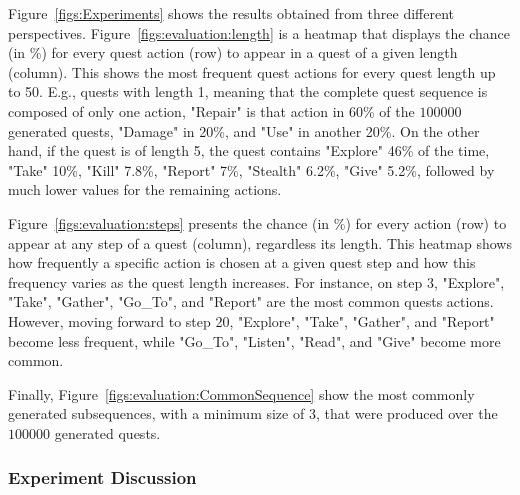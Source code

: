 
Figure~\ref{figs:Experiments} shows the results obtained from three different perspectives. Figure~\ref{figs:evaluation:length} is a heatmap that displays the chance (in \%) for every quest action (row) to appear in a quest of a given length (column). %
This shows the most frequent quest actions for every quest length up to 50. E.g., quests with length 1, meaning that the complete quest sequence is composed of only one action, "Repair" is that action in 60\% of the $100000$ generated quests, "Damage" in 20\%, and "Use" in another 20\%. On the other hand, if the quest is of length 5, the quest contains "Explore" 46\% of the time, "Take" 10\%, "Kill" 7.8\%, "Report" 7\%, "Stealth" 6.2\%, "Give" 5.2\%, followed by much lower values for the remaining actions.

Figure~\ref{figs:evaluation:steps} presents the chance (in \%) for every action (row) to appear at any step of a quest (column), regardless its length. 
This heatmap shows how frequently a specific action is chosen at a given quest step and how this frequency varies as the quest length increases. For instance, on step 3, "Explore", "Take", "Gather", "Go\_To", and "Report" are the most common quests actions. However, moving forward to step 20, "Explore", "Take", "Gather", and "Report" become less frequent, while  "Go\_To", "Listen", "Read", and "Give" become more common.

Finally, Figure~\ref{figs:evaluation:CommonSequence} show the most commonly generated subsequences, with a minimum size of 3, that were produced over the $100000$ generated quests. 

\subsubsection{Experiment Discussion}

